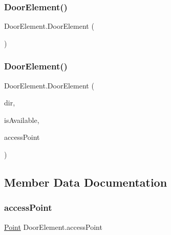 \subsubsection{\texorpdfstring{Door\+Element()}{DoorElement()}\hspace{0.1cm}{\footnotesize\ttfamily [1/2]}}
{\footnotesize\ttfamily Door\+Element.\+Door\+Element (\begin{DoxyParamCaption}{ }\end{DoxyParamCaption})}

\mbox{\label{class_door_element_af47025846529897bd7f91cb3a32cc89a}} 
\subsubsection{\texorpdfstring{Door\+Element()}{DoorElement()}\hspace{0.1cm}{\footnotesize\ttfamily [2/2]}}
{\footnotesize\ttfamily Door\+Element.\+Door\+Element (\begin{DoxyParamCaption}\item[{\mbox{\hyperlink{_directions_enum_8cs_a6bd1f747985f3fcfa3faca85ff3fd8e8}{Directions\+Enum}}}]{dir,  }\item[{bool}]{is\+Available,  }\item[{\mbox{\hyperlink{class_point}{Point}}}]{access\+Point }\end{DoxyParamCaption})}



\subsection{Member Data Documentation}
\mbox{\label{class_door_element_a001885369ad05d140d4ce9652722002d}} 
\subsubsection{\texorpdfstring{access\+Point}{accessPoint}}
{\footnotesize\ttfamily \mbox{\hyperlink{class_point}{Point}} Door\+Element.\+access\+Point}

\mbox{\label{class_door_element_a8c635d9ea1ced9ab8a31eba1423849fd}} 
